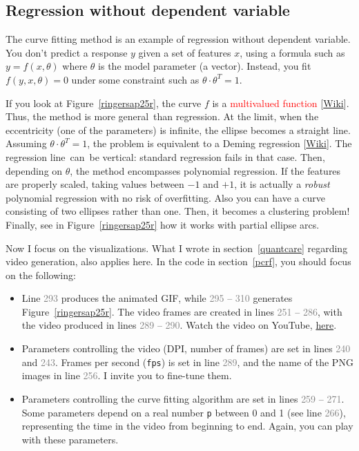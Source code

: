 \documentclass[oneside,10pt]{book}
\begin{document}
\subsection{Regression without dependent variable}

The curve fitting method is an example of regression without dependent variable. You don't predict a response $y$ given a set of features $x$, using
 a formula such as $y = f(x, \theta)$ where $\theta$ is the model parameter (a vector). Instead, you fit $f(y, x, \theta)=0$ under some
 constraint such as $\theta\cdot\theta^T = 1$.


 If you look at Figure~\ref{ringersap25r}, the curve $f$  is a 
\textcolor{red}{multivalued function} [\href{https://en.wikipedia.org/wiki/Multivalued_function}{Wiki}]. 
 Thus, the method is more general~than regression. At the limit, when the eccentricity (one of the parameters) is infinite, the ellipse becomes a straight line. Assuming $\theta\cdot\theta^T=1$, the problem is equivalent to a \textcolor{index}{Deming regression} 
 [\href{https://en.wikipedia.org/wiki/Deming_regression}{Wiki}]. The regression line~can~be vertical: standard regression fails in that case. Then, depending on $\theta$, the method encompasses polynomial regression. If the features are properly scaled, taking values between $-1$ and $+1$, it is actually a {\em robust} polynomial regression with no risk of overfitting. 
Also you can have a curve consisting of two ellipses rather than one. Then, it becomes a clustering problem! 
Finally, see in Figure~\ref{ringersap25r} how it works with partial ellipse arcs. 

Now I focus on the visualizations. What I wrote in section~\ref{quantcare} regarding video generation,  also applies here.
In the code in section~\ref{pcrf}, you should focus on the following:
\vspace{1ex}
\begin{itemize}
\item Line \textcolor{gray}{293} produces the animated GIF, while \textcolor{gray}{295} -- \textcolor{gray}{310} generates Figure~\ref{ringersap25r}. 
The video frames
 are created in lines \textcolor{gray}{251} -- \textcolor{gray}{286}, with the video produced in lines \textcolor{gray}{289} -- \textcolor{gray}{290}. Watch the video on YouTube, 
\href{https://www.youtube.com/watch?v=QSAT546tITM}{here}. 
\item Parameters controlling the video (DPI, number of frames) are set in 
 lines \textcolor{gray}{240} and \textcolor{gray}{243}. Frames per second (\texttt{fps}) is set in 
 line \textcolor{gray}{289}, and the name of the PNG images in line \textcolor{gray}{256}. I invite you to fine-tune them.
\item Parameters controlling the curve fitting algorithm are set in lines \textcolor{gray}{259} -- \textcolor{gray}{271}.
Some parameters depend on a real number \texttt{p} between 0 and 1 (see line \textcolor{gray}{266}), representing the time in the video from beginning to end. 
Again, you can play with these parameters. 
\end{itemize}
\end{document}
